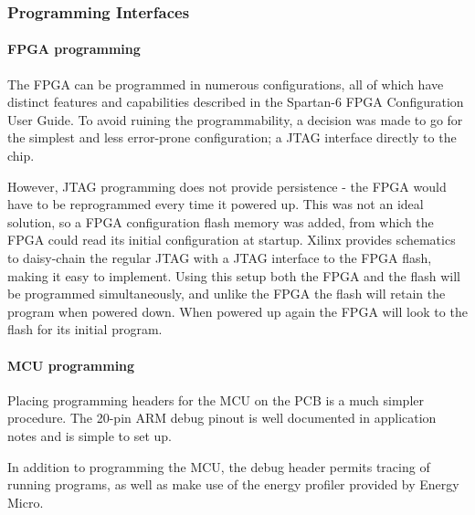 
\subsubsection{Programming Interfaces}

\paragraph{FPGA programming}
The FPGA can be programmed in numerous configurations, all of which have
distinct features and capabilities described in the 
Spartan-6 FPGA Configuration User Guide. To avoid ruining the programmability, a
decision was made to go for the simplest and less error-prone configuration; a
JTAG interface directly to the chip.

However, JTAG programming does not provide persistence - the FPGA would have to
be reprogrammed every time it powered up. This was not an ideal solution, so a
FPGA configuration flash memory was added, from which the FPGA could read its
initial configuration at startup. Xilinx provides schematics to daisy-chain the
regular JTAG with a JTAG interface to the FPGA flash, making it easy to
implement. Using this setup both the FPGA and the flash will be programmed
simultaneously, and unlike the FPGA the flash will retain the program when
powered down. When powered up again the FPGA will look to the flash for its
initial program.

\paragraph{MCU programming}
Placing programming headers for the MCU on the PCB is a much simpler procedure.
The 20-pin ARM debug pinout is well documented in application notes and is
simple to set up.

In addition to programming the MCU, the debug header permits tracing of running
programs, as well as make use of the energy profiler provided by Energy Micro.
